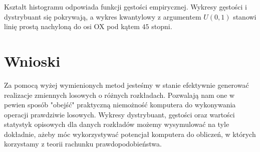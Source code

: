 \documentclass[12pt]{mwart}
\begin{document}
    \begin{figure} [H]
    	\centering 
    \end{figure}
    
    \noindent Kształt histogramu odpowiada funkcji gęstości empirycznej. Wykresy gęstości i dystrybuant się pokrywają, a wykres kwantylowy z argumentem $U \left( 0,1 \right) $ stanowi linię prostą nachyloną do osi OX pod kątem $45$ stopni.
   
   \section{Wnioski}
   \noindent Za pomocą wyżej wymienionych metod jesteśmy w stanie efektywnie generować realizacje zmiennych losowych o różnych rozkładach. Pozwalają nam one w pewien sposób "obejść" praktyczną niemożność komputera do wykonywania operacji prawdziwie losowych. Wykresy dystrybuant, gęstości oraz wartości statystyk opisowych dla danych rozkładów możemy wysymulować na tyle dokładnie, ażeby móc wykorzystywać potencjał komputera do obliczeń, w których korzystamy z teorii rachunku prawdopodobieństwa.
 
\end{document}
